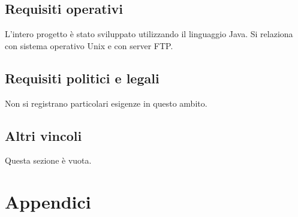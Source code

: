 \documentclass[a4paper,11pt]{article}       %
\begin{document}
    \subsection{Requisiti operativi}
    L'intero progetto è stato sviluppato utilizzando il linguaggio Java.
	Si relaziona con \gls{sistema operativo} Unix e con \gls{server FTP}.
    
    \subsection{Requisiti politici e legali}
    Non si registrano particolari esigenze in questo ambito.
    
    \subsection{Altri vincoli}
    Questa sezione è vuota.

\clearpage
\section{Appendici}
    \printglossary[nonumberlist]
\end{document}
